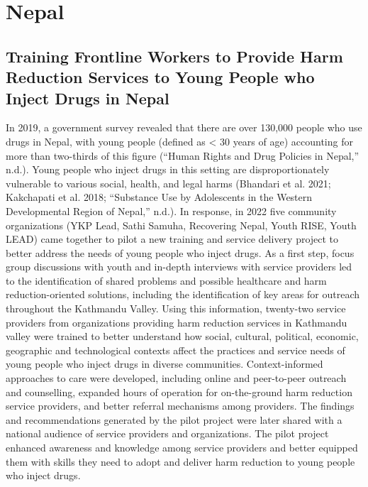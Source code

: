 \documentclass[
  letterpaper,
  DIV=11,
  numbers=noendperiod]{scrartcl}
\begin{document}
\section{Nepal}

\subsection{Training Frontline Workers to Provide Harm Reduction
Services to Young People who Inject Drugs in
Nepal}\label{training-frontline-workers-to-provide-harm-reduction-services-to-young-people-who-inject-drugs-in-nepal}

In 2019, a government survey revealed that there are over 130,000 people
who use drugs in Nepal, with young people (defined as \textless{} 30
years of age) accounting for more than two-thirds of this figure
({``Human Rights and Drug Policies in Nepal,''} n.d.). Young people who
inject drugs in this setting are disproportionately vulnerable to
various social, health, and legal harms (Bhandari et al. 2021;
Kakchapati et al. 2018; {``Substance Use by Adolescents in the Western
Developmental Region of Nepal,''} n.d.). In response, in 2022 five
community organizations (YKP Lead, Sathi Samuha, Recovering Nepal, Youth
RISE, Youth LEAD) came together to pilot a new training and service
delivery project to better address the needs of young people who inject
drugs. As a first step, focus group discussions with youth and in-depth
interviews with service providers led to the identification of shared
problems and possible healthcare and harm reduction-oriented solutions,
including the identification of key areas for outreach throughout the
Kathmandu Valley. Using this information, twenty-two service providers
from organizations providing harm reduction services in Kathmandu valley
were trained to better understand how social, cultural, political,
economic, geographic and technological contexts affect the practices and
service needs of young people who inject drugs in diverse communities.
Context-informed approaches to care were developed, including online and
peer-to-peer outreach and counselling, expanded hours of operation for
on-the-ground harm reduction service providers, and better referral
mechanisms among providers. The findings and recommendations generated
by the pilot project were later shared with a national audience of
service providers and organizations. The pilot project enhanced
awareness and knowledge among service providers and better equipped them
with skills they need to adopt and deliver harm reduction to young
people who inject drugs.
\end{document}
